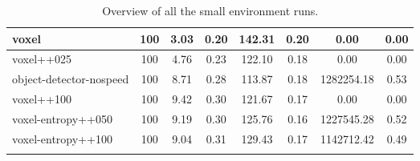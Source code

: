 \begin{sidewaystable}
\begin{longtable}{|l|c|c| c|c| c|c|c|}
        voxel & 100 & {\cellcolor[HTML]{BDDCD5}} \color[HTML]{000000} 3.03 & {\cellcolor[HTML]{BADAD4}} \color[HTML]{000000} 0.20 & {\cellcolor[HTML]{A0CEC5}} \color[HTML]{000000} 142.31 & 0.20 & 0.00 & 0.00 \\ \hline
        voxel++025 & 100 & {\cellcolor[HTML]{A0CEC5}} \color[HTML]{000000} 4.76 & {\cellcolor[HTML]{99CBC0}} \color[HTML]{000000} 0.23 & {\cellcolor[HTML]{ABD3CB}} \color[HTML]{000000} 122.10 & 0.18 & 0.00 & 0.00 \\ \hline
        object-detector-nospeed & 100 & {\cellcolor[HTML]{60AFA0}} \color[HTML]{F1F1F1} 8.71 & {\cellcolor[HTML]{6FB6A8}} \color[HTML]{F1F1F1} 0.28 & {\cellcolor[HTML]{AFD5CD}} \color[HTML]{000000} 113.87 & 0.18 & 1282254.18 & 0.53 \\ \hline
        voxel++100 & 100 & {\cellcolor[HTML]{55AA99}} \color[HTML]{F1F1F1} 9.42 & {\cellcolor[HTML]{5DAE9D}} \color[HTML]{F1F1F1} 0.30 & {\cellcolor[HTML]{ABD3CB}} \color[HTML]{000000} 121.67 & 0.17 & 0.00 & 0.00 \\ \hline
        voxel-entropy++050 & 100 & {\cellcolor[HTML]{59AC9B}} \color[HTML]{F1F1F1} 9.19 & {\cellcolor[HTML]{59AC9B}} \color[HTML]{F1F1F1} 0.30 & {\cellcolor[HTML]{A9D2CA}} \color[HTML]{000000} 125.76 & 0.16 & 1227545.28 & 0.52 \\ \hline
        voxel-entropy++100 & 100 & {\cellcolor[HTML]{5BAD9C}} \color[HTML]{F1F1F1} 9.04 & {\cellcolor[HTML]{55AA99}} \color[HTML]{F1F1F1} 0.31 & {\cellcolor[HTML]{A7D1C9}} \color[HTML]{000000} 129.43 & 0.17 & 1142712.42 & 0.49 \\ \hline
        
        \caption{Overview of all the small environment runs.}
        \label{tab:results-small-env-voxel}
    \end{longtable}

\end{sidewaystable}

